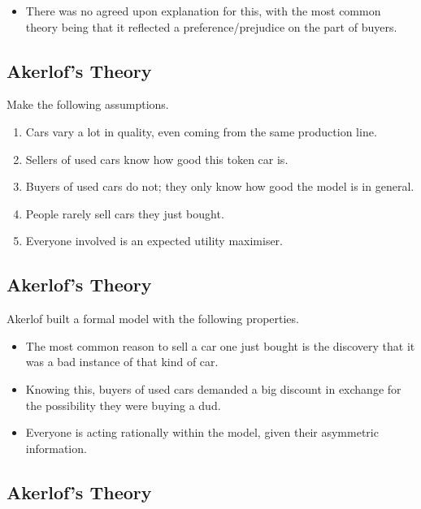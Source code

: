 \documentclass[
  11pt,
  letterpaper,
  DIV=11,
  numbers=noendperiod,
  oneside]{scrartcl}
\providecommand{\tightlist}{%
  \setlength{\itemsep}{0pt}\setlength{\parskip}{0pt}}\usepackage{longtable,booktabs,array}
\begin{document}
\begin{itemize}
\tightlist
\item
  There was no agreed upon explanation for this, with the most common
  theory being that it reflected a preference/prejudice on the part of
  buyers.
\end{itemize}

\subsection{Akerlof's Theory}\label{akerlofs-theory}

Make the following assumptions.

\begin{enumerate}
\def\labelenumi{\arabic{enumi}.}
\tightlist
\item
  Cars vary a lot in quality, even coming from the same production line.
\item
  Sellers of used cars know how good this token car is.
\item
  Buyers of used cars do not; they only know how good the model is in
  general.
\item
  People rarely sell cars they just bought.
\item
  Everyone involved is an expected utility maximiser.
\end{enumerate}

\subsection{Akerlof's Theory}\label{akerlofs-theory-1}

Akerlof built a formal model with the following properties.

\begin{itemize}
\tightlist
\item
  The most common reason to sell a car one just bought is the discovery
  that it was a bad instance of that kind of car.
\item
  Knowing this, buyers of used cars demanded a big discount in exchange
  for the possibility they were buying a dud.
\item
  Everyone is acting rationally within the model, given their asymmetric
  information.
\end{itemize}

\subsection{Akerlof's Theory}\label{akerlofs-theory-2}
\end{document}
